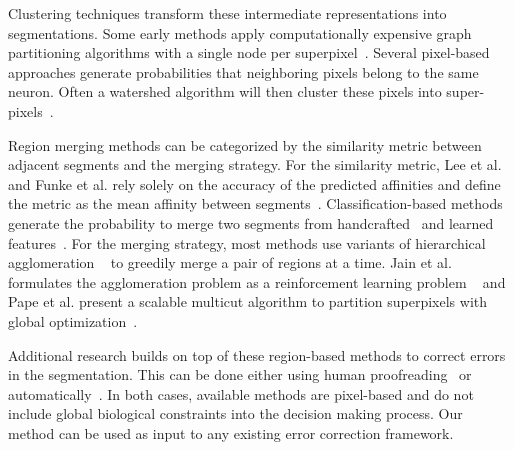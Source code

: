 Clustering techniques transform these intermediate representations into segmentations.
Some early methods apply computationally expensive graph partitioning algorithms with a single node per superpixel~\cite{andres2012globally}.
Several pixel-based approaches generate probabilities that neighboring pixels belong to the same neuron.
Often a watershed algorithm will then cluster these pixels into super-pixels~\cite{zlateski2015image}.

Region merging methods can be categorized by the similarity metric between adjacent segments and the merging strategy.
For the similarity metric, Lee et al. and Funke et al. rely solely on the accuracy of the predicted affinities and define the metric as the mean affinity between segments~\cite{funke2017deep,lee2017superhuman}.
Classification-based methods generate the probability to merge two segments from handcrafted~\cite{jain2011learning,seymour2016rhoananet,nunez2014graph,10.1371/journal.pone.0125825,parag2017anisotropic,zlateski2015image} and learned features~\cite{bogovic2013learned}. 
For the merging strategy, most methods use variants of hierarchical agglomeration ~\cite{seymour2016rhoananet,nunez2014graph,10.1371/journal.pone.0125825,parag2017anisotropic,zlateski2015image} to greedily merge a pair of regions at a time.
Jain et al. formulates the agglomeration problem as a reinforcement learning problem ~\cite{jain2011learning} and Pape et al. present a scalable multicut algorithm to partition superpixels with global optimization~\cite{beier2017multicut}.

Additional research builds on top of these region-based methods to correct errors in the segmentation. This can be done either using human proofreading~\cite{haehn2017guided,haehn2014design,mojo2} or automatically~\cite{rolnick2017morphological,error_correction_using_CNN}. In both cases, available methods are pixel-based and do not include global biological constraints into the decision making process. Our method can be used as input to any existing error correction framework.

